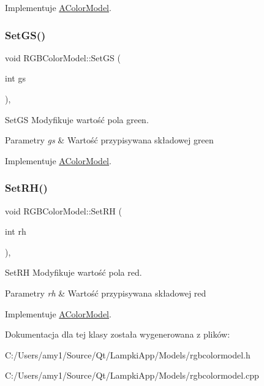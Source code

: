 Implementuje \mbox{\hyperlink{class_a_color_model}{A\+Color\+Model}}.

\mbox{\label{class_r_g_b_color_model_a0b48f8097e7edf4a5e28e101a62c671a}} 
\subsubsection{\texorpdfstring{Set\+G\+S()}{SetGS()}}
{\footnotesize\ttfamily void R\+G\+B\+Color\+Model\+::\+Set\+GS (\begin{DoxyParamCaption}\item[{int}]{gs }\end{DoxyParamCaption})\hspace{0.3cm}{\ttfamily [override]}, {\ttfamily [virtual]}}



Set\+GS Modyfikuje wartość pola green. 


\begin{DoxyParams}{Parametry}
{\em gs} & Wartość przypisywana składowej green \\
\hline
\end{DoxyParams}


Implementuje \mbox{\hyperlink{class_a_color_model}{A\+Color\+Model}}.

\mbox{\label{class_r_g_b_color_model_a2cfefda5444f0b9479aca4b661f1790b}} 
\subsubsection{\texorpdfstring{Set\+R\+H()}{SetRH()}}
{\footnotesize\ttfamily void R\+G\+B\+Color\+Model\+::\+Set\+RH (\begin{DoxyParamCaption}\item[{int}]{rh }\end{DoxyParamCaption})\hspace{0.3cm}{\ttfamily [override]}, {\ttfamily [virtual]}}



Set\+RH Modyfikuje wartość pola red. 


\begin{DoxyParams}{Parametry}
{\em rh} & Wartość przypisywana składowej red \\
\hline
\end{DoxyParams}


Implementuje \mbox{\hyperlink{class_a_color_model}{A\+Color\+Model}}.



Dokumentacja dla tej klasy została wygenerowana z plików\+:\begin{DoxyCompactItemize}
\item 
C\+:/\+Users/amy1/\+Source/\+Qt/\+Lampki\+App/\+Models/rgbcolormodel.\+h\item 
C\+:/\+Users/amy1/\+Source/\+Qt/\+Lampki\+App/\+Models/rgbcolormodel.\+cpp\end{DoxyCompactItemize}
